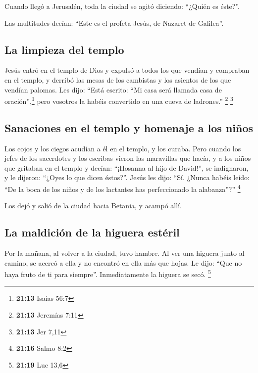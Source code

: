  Cuando llegó a Jerusalén, toda la ciudad se agitó
diciendo: ``¿Quién es éste?''.

 Las multitudes decían: ``Este es el profeta Jesús, de
Nazaret de Galilea''.

\hypertarget{la-limpieza-del-templo}{%
\subsection{La limpieza del templo}\label{la-limpieza-del-templo}}

 Jesús entró en el templo de Dios y expulsó a todos los
que vendían y compraban en el templo, y derribó las mesas de los
cambistas y los asientos de los que vendían palomas.  Les
dijo: ``Está escrito: ``Mi casa será llamada casa de
oración'',\footnote{\textbf{21:13} Isaías 56:7} pero vosotros la habéis
convertido en una cueva de ladrones.'' \footnote{\textbf{21:13} Jeremías
  7:11} \footnote{\textbf{21:13} Jer 7,11}

\hypertarget{sanaciones-en-el-templo-y-homenaje-a-los-niuxf1os}{%
\subsection{Sanaciones en el templo y homenaje a los
niños}\label{sanaciones-en-el-templo-y-homenaje-a-los-niuxf1os}}

 Los cojos y los ciegos acudían a él en el templo, y los
curaba.  Pero cuando los jefes de los sacerdotes y los
escribas vieron las maravillas que hacía, y a los niños que gritaban en
el templo y decían: ``¡Hosanna al hijo de David!'', se indignaron,
 y le dijeron: ``¿Oyes lo que dicen éstos?''. Jesús les
dijo: ``Sí. ¿Nunca habéis leído: ``De la boca de los niños y de los
lactantes has perfeccionado la alabanza''?'' \footnote{\textbf{21:16}
  Salmo 8:2}

 Los dejó y salió de la ciudad hacia Betania, y acampó
allí.

\hypertarget{la-maldiciuxf3n-de-la-higuera-estuxe9ril}{%
\subsection{La maldición de la higuera
estéril}\label{la-maldiciuxf3n-de-la-higuera-estuxe9ril}}

 Por la mañana, al volver a la ciudad, tuvo hambre.
 Al ver una higuera junto al camino, se acercó a ella y
no encontró en ella más que hojas. Le dijo: ``Que no haya fruto de ti
para siempre''. Inmediatamente la higuera se secó. \footnote{\textbf{21:19}
  Luc 13,6}

